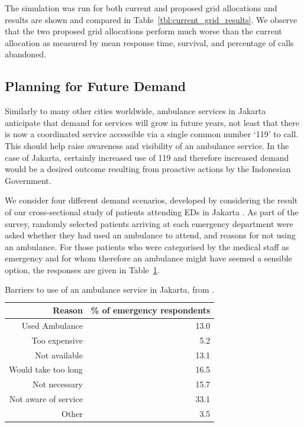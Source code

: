 \documentclass[preprint,12pt]{elsarticle}
\begin{document}
The simulation was run for both current  and proposed grid allocations and results are shown and compared in Table~\ref{tbl:current_grid_results}.  We observe that the two proposed grid allocations perform much worse than the current allocation as measured by mean response time, survival, and percentage of calls abandoned.

\subsection{Planning for Future Demand}\label{sec:demand_scenarios}
Similarly to many other cities worldwide, ambulance services in Jakarta anticipate that demand for services will grow in future years, not least that there is now a coordinated service accessible via a single common number `119' to call. This should help raise awareness and visibility of an ambulance service. In the case of Jakarta, certainly increased use of 119 and therefore increased demand would be a desired outcome resulting from proactive actions by the Indonesian Government. 

We consider four different demand scenarios, developed by considering the result of our cross-sectional study of patients attending EDs in Jakarta \cite{BriceSyaribahNoor2022Esui}. As part of the survey, randomly selected patients arriving at each emergency department were asked whether they had used an ambulance to attend, and reasons for not using an ambulance. For those patients who were categorised by the medical staff as emergency and for whom therefore an ambulance might have seemed a sensible option, the responses are given in Table~\ref{table:survey_results}.

\begin{table}
\centering
\begin{tabular}{rr}
\toprule
Reason & \% of emergency respondents \\

\midrule
Used Ambulance & 13.0\\
Too expensive & 5.2  \\
Not available  & 13.1 \\
Would take too long & 16.5 \\
Not necessary & 15.7  \\
Not aware of service & 33.1\\
Other &3.5 \\

 \bottomrule
\end{tabular}
\caption{Barriers to use of an ambulance service in Jakarta, from \cite{BriceSyaribahNoor2022Esui}.}
\label{table:survey_results}
\end{table}
\end{document}
